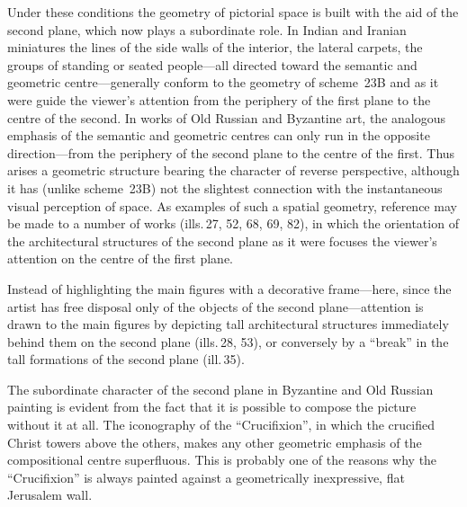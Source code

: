 Under these conditions the geometry of pictorial space is built with the aid of the
second plane, which now plays a subordinate role. In Indian and Iranian miniatures
the lines of the side walls of the interior, the lateral carpets, the groups of
standing or seated people---all directed toward the semantic and geometric
centre---generally conform to the geometry of scheme~23B and as it were guide the
viewer's attention from the periphery of the first plane to the centre of the
second. In works of Old Russian and Byzantine art, the analogous emphasis of the
semantic and geometric centres can only run in the opposite direction---from the
periphery of the second plane to the centre of the first. Thus arises a geometric
structure bearing the character of reverse perspective, although it has (unlike
scheme~23B) not the slightest connection with the instantaneous visual perception
of space. As examples of such a spatial geometry, reference may be made to a number
of works (ills.\,27, 52, 68, 69, 82), in which the orientation of the architectural
structures of the second plane as it were focuses the viewer's attention on the
centre of the first plane.

Instead of highlighting the main figures with a decorative frame---here, since the
artist has free disposal only of the objects of the second plane---attention is drawn
to the main figures by depicting tall architectural structures immediately behind
them on the second plane (ills.\,28, 53), or conversely by a ``break'' in the tall
formations of the second plane (ill.\,35).

The subordinate character of the second plane in Byzantine and Old Russian painting
is evident from the fact that it is possible to compose the picture without it at
all. The iconography of the ``Crucifixion'', in which the crucified Christ towers
above the others, makes any other geometric emphasis of the compositional centre
superfluous. This is probably one of the reasons why the ``Crucifixion'' is always
painted against a geometrically inexpressive, flat Jerusalem wall.


